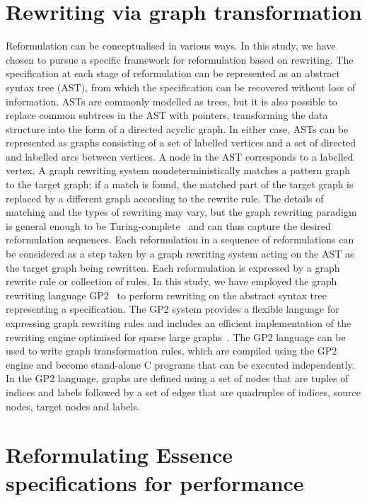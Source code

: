 \documentclass[a4paper,UKenglish,cleveref,pdfa]{lipics-v2021}
\begin{document}
\section{Rewriting via graph transformation}

Reformulation can be conceptualised in various ways. In this study, we have chosen to pursue a specific framework for reformulation based on rewriting. The specification at each stage of reformulation can be represented as an abstract syntax tree (AST), from which the specification can be recovered without loss of information. ASTs are commonly modelled as trees, but it is also possible to replace common subtrees in the AST with pointers, transforming the data structure into the form of a directed acyclic graph. In either case, ASTs can be represented as graphs consisting of a set of labelled vertices and a set of directed and labelled arcs between vertices. A node in the AST corresponds to a labelled vertex. A graph rewriting system nondeterministically matches a pattern graph to the target graph; if a match is found, the matched part of the target graph is replaced by a different graph according to the rewrite rule. The details of matching and the types of rewriting may vary, but the graph rewriting paradigm is general enough to be Turing-complete~\cite{habel2001computational} and can thus capture the desired reformulation sequences. Each reformulation in a sequence of reformulations can be considered as a step taken by a graph rewriting system acting on the AST as the target graph being rewritten. Each reformulation is expressed by a graph rewrite rule or collection of rules. In this study, we have employed the graph rewriting language GP2~\cite{plump2017imperative} to perform rewriting on the abstract syntax tree representing a specification. The GP2 system provides a flexible language for expressing graph rewriting rules and includes an efficient implementation of the rewriting engine optimised for sparse large graphs~\cite{campbell2020improved}. The GP2 language can be used to write graph transformation rules, which are compiled using the GP2 engine and become stand-alone C programs that can be executed independently. In the GP2 language, graphs are defined using a set of nodes that are tuples of indices and labels followed by a set of edges that are quadruples of indices, source nodes, target nodes and labels.


\section{Reformulating Essence specifications for performance}
\end{document}
